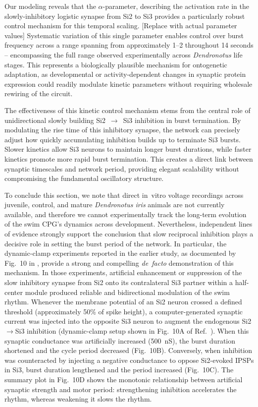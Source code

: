 \documentclass[nofootinbib,aip,amsmath,amssymb,reprint,twocolumn,10pt]{revtex4-2}
\begin{document}
Our modeling reveals that the $\alpha$-parameter, describing the activation rate in the slowly-inhibitory logistic synapse from Si2 to Si3 provides a particularly robust control mechanism for this temporal scaling. {\color{red}[Replace with actual parameter values]} Systematic variation of this single parameter enables control over burst frequency across a range spanning from approximately 1--2 throughout 14 seconds -- encompassing the full range observed experimentally across \textit{Dendronotus} life stages. This represents a biologically plausible mechanism for ontogenetic adaptation, as developmental or activity-dependent changes in synaptic protein expression could readily modulate kinetic parameters without requiring wholesale rewiring of the circuit.

The effectiveness of this kinetic control mechanism stems from the central role of unidirectional slowly building  Si2~$\to$~Si3 inhibition in burst termination. By modulating the rise time of this inhibitory synapse, the network can precisely adjust how quickly accumulating inhibition builds up to terminate Si3 bursts. Slower kinetics allow Si3 neurons to maintain longer burst durations, while faster kinetics promote more rapid burst termination. This creates a direct link between synaptic timescales and network period, providing elegant scalability without compromising the fundamental oscillatory structure.

To conclude this section, we note that direct in~vitro voltage recordings across juvenile, control, and mature \textit{Dendronotus iris} animals are not currently available, and therefore we cannot experimentally track the long-term evolution of the swim CPG’s dynamics across development. Nevertheless, independent lines of evidence strongly support the conclusion that slow reciprocal inhibition plays a decisive role in setting the burst period of the network. In particular, the dynamic-clamp experiments reported in the earlier study, as documented by Fig.~10 in \cite{sakurai2022bursting}, provide a strong and compelling {\em de~facto} demonstration of this mechanism. In those experiments, artificial enhancement or suppression of the slow inhibitory synapse from Si2 onto its contralateral Si3 partner within a half-center module produced reliable and bidirectional modulation of the swim rhythm. Whenever the membrane potential of an Si2 neuron crossed a defined threshold (approximately 50\% of spike height), a computer-generated synaptic current was injected into the opposite Si3 neuron to augment the endogenous Si2$\rightarrow$Si3 inhibition (dynamic-clamp setup shown in Fig.~10A of Ref.~\cite{sakurai2022bursting}). When this synaptic conductance was artificially increased (500~nS), the burst duration shortened and the cycle period decreased (Fig.~10B). Conversely, when inhibition was counteracted by injecting a negative conductance to oppose Si2-evoked IPSPs in Si3, burst duration lengthened and the period increased (Fig.~10C). The summary plot in Fig.~10D shows the monotonic relationship between artificial synaptic strength and motor period: strengthening inhibition accelerates the rhythm, whereas weakening it slows the rhythm.
\end{document}
